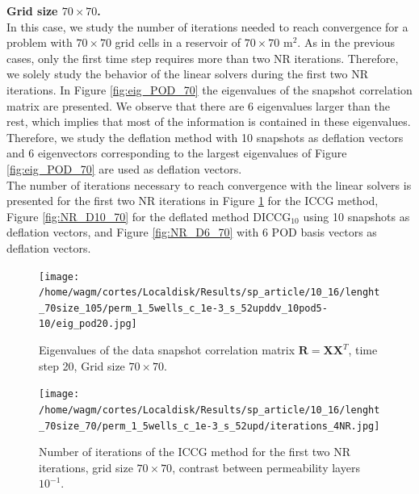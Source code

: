 \documentclass[12pt]{article}
\begin{document}
\textbf{Grid size $70 \times 70 $.}\\
In this case, we study the number of iterations needed to reach convergence for a problem with $70 \times 70$ grid
cells in a reservoir of $70\times 70$ m$^2$.
As in the previous cases, only the first time step requires more than two NR iterations. Therefore, we solely study
the behavior of the linear solvers during the first two NR iterations. 
In Figure \ref{fig:eig_POD_70} the eigenvalues of the snapshot correlation matrix are presented. We observe that
there are 6 eigenvalues larger than the rest, which implies that most of the information is contained in these
eigenvalues. Therefore, we study the deflation method with 10 snapshots as deflation vectors and 6 eigenvectors
corresponding to the largest eigenvalues of Figure \ref{fig:eig_POD_70} are used as deflation vectors. \\
The number of iterations necessary to reach convergence with the linear solvers is presented for the first two
NR iterations in Figure \ref{fig:NR_IC_70} for the ICCG method, Figure \ref{fig:NR_D10_70} for the deflated
method DICCG$_{10}$ using 10 snapshots as deflation vectors, and Figure \ref{fig:NR_D6_70} with 6 POD basis
vectors as deflation vectors.

\begin{figure}[!ht]
\centering
\begin{minipage}{.4\textwidth}
 \centering
\texttt{[image: /home/wagm/cortes/Localdisk/Results/sp\_article/10\_16/lenght\_70size\_105/perm\_1\_5wells\_c\_1e-3\_s\_52upddv\_10pod5-10/eig\_pod20.jpg]}
\caption{Eigenvalues of the data snapshot correlation matrix $\mathbf{R}=\mathbf{X}\mathbf{X}^T$, time step 20, Grid size $70\times70$.}
\label{fig:eig_POD_70}
\end{minipage}%
\hspace{15mm}
\begin{minipage}{.4\textwidth}
\vspace{-0.9cm}
\hspace{-1cm}
\texttt{[image: /home/wagm/cortes/Localdisk/Results/sp\_article/10\_16/lenght\_70size\_70/perm\_1\_5wells\_c\_1e-3\_s\_52upd/iterations\_4NR.jpg]}
\vspace{-1.3cm}
\caption{Number of iterations of the ICCG method for the first two NR iterations, grid size $70\times 70$, contrast between permeability layers $10^{-1}$.}
\label{fig:NR_IC_70}
\end{minipage}
\end{figure}
\end{document}
